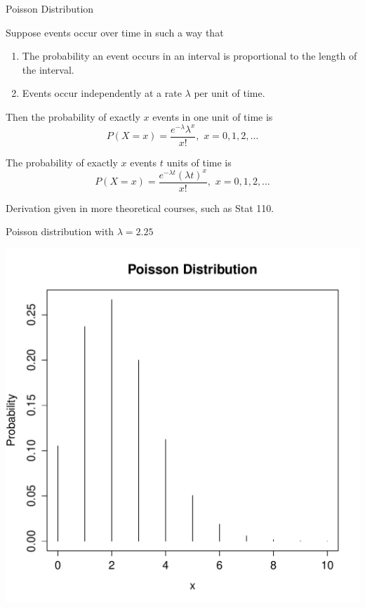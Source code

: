 \documentclass[ignorenonframetext,aspectratio=169]{beamer}
\begin{document}
\begin{frame}{Poisson Distribution}

Suppose events occur over time in such a way that

\begin{enumerate}
\def\labelenumi{\arabic{enumi}.}
\item
  The probability an event occurs in an interval is proportional to the
  length of the interval.
\item
  Events occur independently at a rate \(\lambda\) per unit of time.
\end{enumerate}

Then the probability of exactly \(x\) events in one unit of time is \[
P(X = x) = \frac{e^{-\lambda}\lambda^{x}}{x!}, \,\, x = 0, 1, 2,
\ldots
\]

The probability of exactly \(x\) events \(t\) units of time is \[
P(X = x) = \frac{e^{-\lambda t}(\lambda t)^{x}}{x!}, \,\, x = 0, 1,
2, \ldots
\]

Derivation given in more theoretical courses, such as Stat 110.

\end{frame}

\begin{frame}{Poisson distribution with \(\lambda = 2.25\)}

\includegraphics{./figures/pois_2_25.pdf}

\end{frame}
\end{document}
